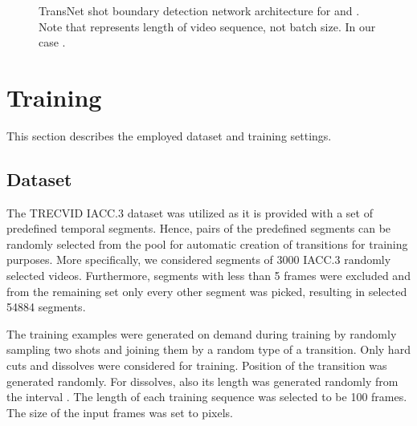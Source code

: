 \begin{figure}[t]
    \caption{TransNet shot boundary detection network architecture for  and . \textmd{Note that  represents length of video sequence, not batch size. In our case .}}
    \label{fig:nn_architecture}
\end{figure}

\section{Training}
This section describes the employed dataset and training settings.

\subsection{Dataset}
The TRECVID IACC.3 dataset \cite{2017trecvidawad} was utilized as it is provided with a set of predefined temporal segments. Hence, pairs of the predefined segments can be randomly selected from the pool for automatic creation of transitions for training purposes. More specifically, we considered segments of 3000 IACC.3 randomly selected videos. Furthermore, segments with less than 5 frames were excluded and from the remaining set only every other segment was picked, resulting in selected 54884 segments.

The training examples were generated on demand during training by randomly sampling two shots and joining them by a random type of a transition. Only hard cuts and dissolves were considered for training. Position of the transition was generated randomly. For dissolves, also its length was generated randomly from the interval . The length  of each training sequence was selected to be 100 frames. The size of the input frames was set to  pixels.


